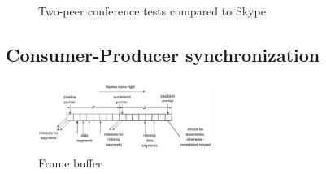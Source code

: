 \documentclass{icn/sig-alternate-2013} %
\begin{document}

%

\begin{figure}[t!]
\centering
\begin{scriptsize}
\def\svgwidth{0.53\textwidth}
\end{scriptsize}
\vspace{-18pt}
\caption{Two-peer conference tests compared to Skype}
\label{fig:tests-skype}
\end{figure}





\subsection{Consumer-Producer synchronization}

\begin{figure}[t!]
\centering
\includegraphics[width=0.5\textwidth]{buffer}
\caption{Frame buffer}
\label{fig:old-buf}
\end{figure}
\end{document}
